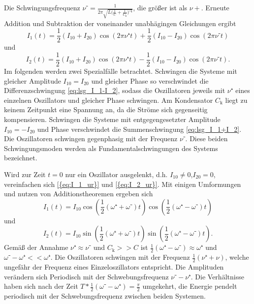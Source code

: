 Die Schwingungsfrequenz $\nu⁻=\frac{1}{2\pi\sqrt{L\bigl({\frac{1}{C}+\frac{1}{C_\mathup{k}}}\bigr)⁻¹}}$, die größer ist als $\nu+$.
Erneute Addition und Subtraktion der voneinander unabhägingen Gleichungen ergibt
\begin{equation}
	I_1(t)=\frac{1}{2}({I_{10}}+{I_{20}})\cos(2\pi\nu⁺t)+\frac{1}{2}({I_{10}}-{I_{20}})\cos(2\pi\nu⁻t)
	\label{eq:I_1_ur}
\end{equation}
und
\begin{equation}
	I_2(t)=\frac{1}{2}({I_{10}}+{I_{20}})\cos(2\pi\nu⁺t)-\frac{1}{2}({I_{10}}-{I_{20}})\cos(2\pi\nu⁻t).
	\label{eq:I_2_ur}
\end{equation}
Im folgenden werden zwei Spezialfälle betrachtet. 
Schwingen die Systeme mit gleicher Amplitude $I_{10}=I_{20}$ und gleicher Phase so verschwindet die Differenzschwingung \eqref{eq:lsg_I_1-I_2}, sodass die Oszillatoren jeweils mit $\nu⁺$ eines einzelnen Oszillators und gleicher Phase schwingen.
 Am Kondensator $C_\mathup{k}$ liegt zu keinem Zeitpunkt eine Spannung an, da die Ströme sich gegenseitig kompensieren.
Schwingen die Systeme mit entgegengesetzter Amplitude  $I_{10}=-I_{20}$ und Phase verschwindet die Summenschwingung \eqref{eq:lsg_I_1+I_2}. Die Oszillatoren schwingen gegenphasig mit der Frequenz $\nu⁻$.
Diese beiden Schwingungsmoden werden als Fundamentalschwingungen des Systems bezeichnet.

Wird zur Zeit $t=0$ nur ein Oszillator ausgelenkt, d.h. $I_{10}\neq0$,$I_{20}=0$, vereinfachen sich \eqref{{eq:I_1_ur}} und \eqref{{eq:I_2_ur}}. 
Mit einigen Umformungen und nutzen von Additionstheoremen ergeben sich
\begin{equation}
	I_1(t)=I_{10}\cos(\frac{1}{2}(\omega⁺+\omega⁻)t)\cos(\frac{1}{2}(\omega⁺-\omega⁻)t)
\end{equation}
und
\begin{equation}
	I_2(t)=I_{10}\sin(\frac{1}{2}(\omega⁺+\omega⁻)t)\sin(\frac{1}{2}(\omega⁺-\omega⁻)t).
\end{equation}
Gemäß der Annahme $\nu⁺\approx\nu⁻$ und $C_\mathup{k}>>C$ ist $\frac{1}{2}(\omega⁺-\omega⁻)\approx\omega⁺$ und $\omega⁻-\omega⁺<<\omega⁺$.
Die Oszillatoren schwingen mit der Frequenz $\frac{1}{2}(\nu⁺+\nu)$, welche ungefähr der Frequenz eines Einzeloszillators entspricht. 
Die Amplituden verändern sich Periodisch mit der Schwebungsfrequenz $\nu⁻-\nu⁺$. 
Die Verhältnisse haben sich nach der Zeit $T*\frac{1}{2}({\omega⁻-\omega⁺})=\frac{\pi}{2}$ umgekehrt, die Energie pendelt periodisch mit der Schwebungsfrequenz zwischen beiden Systemen.

